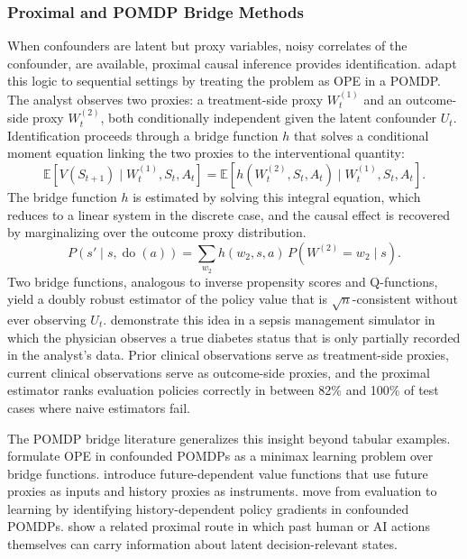 \subsubsection{Proximal and POMDP Bridge Methods}
\label{subsubsec:proximal}

When confounders are latent but proxy variables, noisy correlates of the confounder, are available, proximal causal inference provides identification. \citet{bennett2021proximal} adapt this logic to sequential settings by treating the problem as OPE in a POMDP. The analyst observes two proxies: a treatment-side proxy $W_t^{(1)}$ and an outcome-side proxy $W_t^{(2)}$, both conditionally independent given the latent confounder $U_t$. Identification proceeds through a bridge function $h$ that solves a conditional moment equation linking the two proxies to the interventional quantity:
\begin{equation}
\mathbb{E}[V(S_{t+1}) \mid W_t^{(1)}, S_t, A_t] = \mathbb{E}[h(W_t^{(2)}, S_t, A_t) \mid W_t^{(1)}, S_t, A_t].
\label{eq:bridge}
\end{equation}
The bridge function $h$ is estimated by solving this integral equation, which reduces to a linear system in the discrete case, and the causal effect is recovered by marginalizing over the outcome proxy distribution.
\begin{equation}
P(s' \mid s, \operatorname{do}(a)) = \sum_{w_2} h(w_2, s, a) \, P(W^{(2)}{=}w_2 \mid s).
\label{eq:proximal_adj}
\end{equation}
Two bridge functions, analogous to inverse propensity scores and Q-functions, yield a doubly robust estimator of the policy value that is $\sqrt{n}$-consistent without ever observing $U_t$. \citet{bennett2021proximal} demonstrate this idea in a sepsis management simulator in which the physician observes a true diabetes status that is only partially recorded in the analyst's data. Prior clinical observations serve as treatment-side proxies, current clinical observations serve as outcome-side proxies, and the proximal estimator ranks evaluation policies correctly in between 82\% and 100\% of test cases where naive estimators fail.

The POMDP bridge literature generalizes this insight beyond tabular examples. \citet{shiUeharaHuangJiang2022minimaxPOMDP} formulate OPE in confounded POMDPs as a minimax learning problem over bridge functions. \citet{ueharaEtAl2023futureDependent} introduce future-dependent value functions that use future proxies as inputs and history proxies as instruments. \citet{hongQiXu2024policyGradientPOMDP} move from evaluation to learning by identifying history-dependent policy gradients in confounded POMDPs. \citet{wangQiShi2025superPolicy} show a related proximal route in which past human or AI actions themselves can carry information about latent decision-relevant states.


